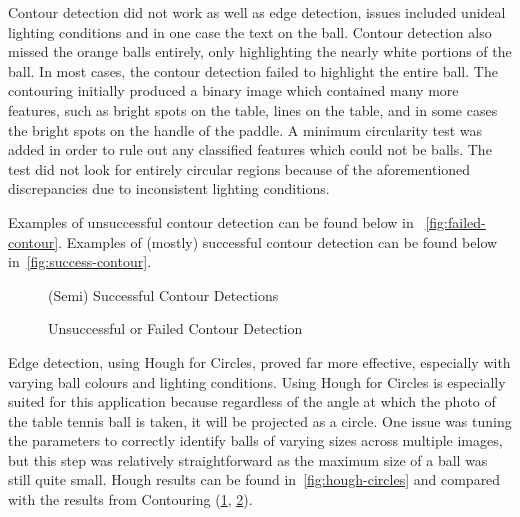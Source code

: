 Contour detection did not work as well as edge detection, issues included unideal lighting conditions and in one case the text on the ball. Contour detection also missed the orange balls entirely, only highlighting the nearly white portions of the ball.  In most cases, the contour detection failed to highlight the entire ball. The contouring initially produced a binary image which contained many more features, such as bright spots on the table, lines on the table, and in some cases the bright spots on the handle of the paddle. A minimum circularity test was added in order to rule out any classified features which could not be balls. The test did not look for entirely circular regions because of the aforementioned discrepancies due to inconsistent lighting conditions. 

Examples of unsuccessful contour detection can be found below in ~\autoref{fig:failed-contour}.
Examples of (mostly) successful contour detection can be found below in~\autoref{fig:success-contour}.

\begin{figure}[H]
    \centering
    \hfill
    \hfill
    \caption{(Semi) Successful Contour Detections}
    \label{fig:success-contour}
\end{figure}

\begin{figure}[H]
    \centering
    \hfill
    \caption{Unsuccessful or Failed Contour Detection}
    \label{fig:failed-contour}
\end{figure}

Edge detection, using Hough for Circles, proved far more effective, especially with varying ball colours and lighting conditions. Using Hough for Circles is especially suited for this application because regardless of the angle at which the photo of the table tennis ball is taken, it will be projected as a circle. One issue was tuning the parameters to correctly identify balls of varying sizes across multiple images, but this step was relatively straightforward as the maximum size of a ball was still quite small. Hough results can be found in~\autoref{fig:hough-circles} and compared with the results from Contouring (\ref{fig:success-contour}, \ref{fig:failed-contour}).

